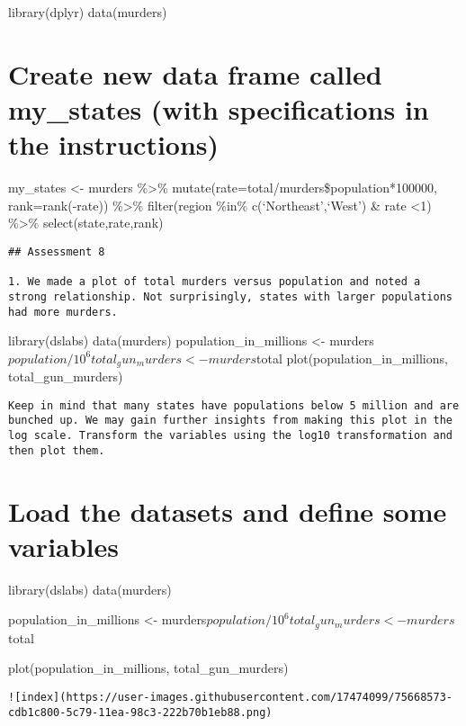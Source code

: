 \documentclass[
]{article}
\begin{document}
library(dplyr) data(murders)

\hypertarget{create-new-data-frame-called-my_states-with-specifications-in-the-instructions}{%
\section{Create new data frame called my\_states (with specifications in
the
instructions)}\label{create-new-data-frame-called-my_states-with-specifications-in-the-instructions}}

my\_states \textless- murders \%\textgreater\%
mutate(rate=total/murders\$population*100000, rank=rank(-rate))
\%\textgreater\% filter(region \%in\% c(`Northeast',`West') \& rate
\textless1) \%\textgreater\% select(state,rate,rank)

\begin{verbatim}
## Assessment 8

1. We made a plot of total murders versus population and noted a strong relationship. Not surprisingly, states with larger populations had more murders.
\end{verbatim}

library(dslabs) data(murders) population\_in\_millions \textless-
murders\(population/10^6 total_gun_murders <− murders\)total
plot(population\_in\_millions, total\_gun\_murders)

\begin{verbatim}
Keep in mind that many states have populations below 5 million and are bunched up. We may gain further insights from making this plot in the log scale. Transform the variables using the log10 transformation and then plot them.
\end{verbatim}

\hypertarget{load-the-datasets-and-define-some-variables}{%
\section{Load the datasets and define some
variables}\label{load-the-datasets-and-define-some-variables}}

library(dslabs) data(murders)

population\_in\_millions \textless-
murders\(population/10^6 total_gun_murders <- murders\)total

plot(population\_in\_millions, total\_gun\_murders)

\begin{verbatim}
![index](https://user-images.githubusercontent.com/17474099/75668573-cdb1c800-5c79-11ea-98c3-222b70b1eb88.png)
\end{verbatim}
\end{document}
